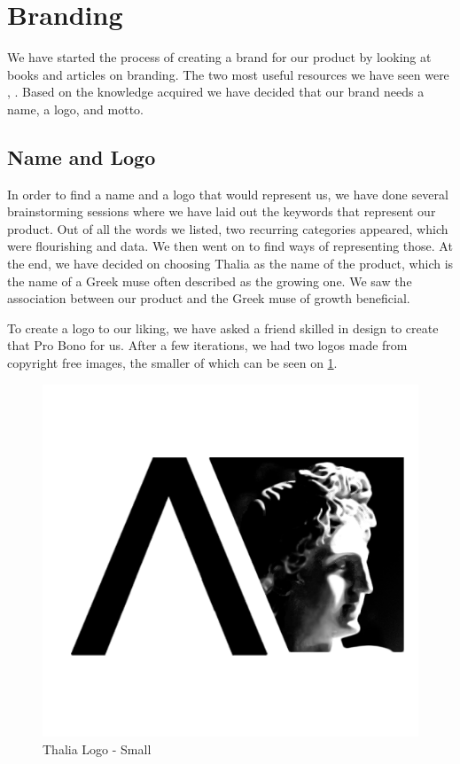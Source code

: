 \documentclass[main.tex]{subfiles}
\begin{document}
\section{Branding}
We have started the process of creating a brand for our product by looking at books and articles on branding. The two most useful resources we have seen were  \cite{basics_branding}, \cite{clifton_2009}. Based on the knowledge acquired we have decided that our brand needs a name, a logo, and motto.

\subsection{Name and Logo}
In order to find a name and a logo that would represent us, we have done several brainstorming sessions where we have laid out the keywords that represent our product. Out of all the words we listed, two recurring categories appeared, which were flourishing and data. We then went on to find ways of representing those. At the end, we have decided on choosing Thalia as the name of the product, which is the name of a Greek muse often described as the growing one. We saw the association between our product and the Greek muse of growth beneficial.

To create a logo to our liking, we have asked a friend skilled in design to create that Pro Bono for us. After a few iterations, we had two logos made from copyright free images, the smaller of which can be seen on \figurename{\ref{small_logo}}.

\begin{figure}[H]
    \centering
    \includegraphics[scale=0.4]{00Branding/00Pictures/small_logo.png}
    \caption{Thalia Logo - Small}
    \label{small_logo}
\end{figure}
\end{document}

